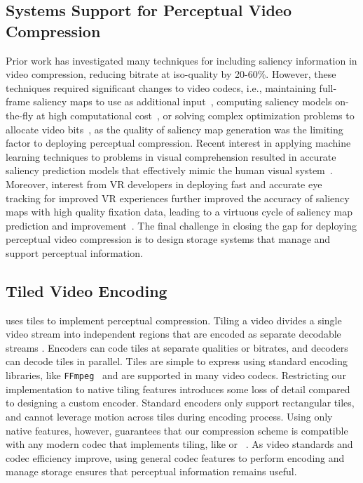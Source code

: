 \subsection{Systems Support for Perceptual Video Compression} Prior work has investigated many techniques for including saliency information in video compression, reducing bitrate at iso-quality by 20-60\%.
However, these techniques required significant changes to video codecs, i.e., maintaining full-frame saliency maps to use as additional input~\cite{8117038}, computing saliency models on-the-fly at high computational cost~\cite{5223506}, or solving complex optimization problems to allocate video bits~\cite{li2011visual}, as the quality of saliency map generation was the limiting factor to deploying perceptual compression.
Recent interest in applying machine learning techniques to problems in visual comprehension resulted in accurate saliency prediction models that effectively mimic the human visual system~\cite{bylinskii2016saliency}.
Moreover, interest from VR developers in deploying fast and accurate eye tracking for improved VR experiences further improved the accuracy of saliency maps with high quality fixation data, leading to a virtuous cycle of saliency map prediction and improvement~\cite{Whitmire:2016:ESC:2971763.2971771}.
The final challenge in closing the gap for deploying perceptual video compression is to design storage systems that manage and support perceptual information.

\subsection{Tiled Video Encoding} \name uses tiles to implement perceptual compression.
Tiling a video divides a single video stream into independent regions that are encoded as separate decodable streams \cite{6547985}.
Encoders can code tiles at separate qualities or bitrates, and decoders can decode tiles in parallel.
Tiles are simple to express using standard encoding libraries, like \texttt{FFmpeg}~\cite{ffmpeg} and are supported in many video codecs.
Restricting our implementation to native tiling features introduces some loss of detail compared to designing a custom encoder.
Standard encoders only support rectangular tiles, and cannot leverage motion across tiles during encoding process.
Using only native features, however, guarantees that our compression scheme is compatible with any modern codec that implements tiling, like \hevc or \avone~\cite{avone}.
As video standards and codec efficiency improve, using general codec features to perform encoding and manage storage ensures that perceptual information remains useful.
